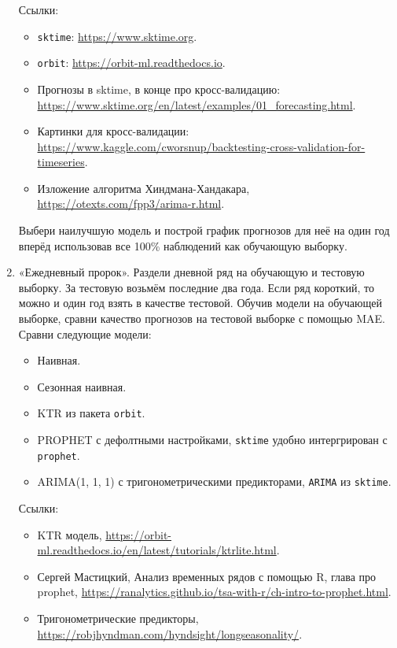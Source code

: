 \documentclass[12pt]{article}
\begin{document}
\begin{enumerate}
    Ссылки: 
    \begin{itemize}
        \item \verb|sktime|: \url{https://www.sktime.org}.
        \item \verb|orbit|: \url{https://orbit-ml.readthedocs.io}.
        \item Прогнозы в sktime, в конце про кросс-валидацию: \url{https://www.sktime.org/en/latest/examples/01_forecasting.html}.
        \item Картинки для кросс-валидации: \url{https://www.kaggle.com/cworsnup/backtesting-cross-validation-for-timeseries}.
        \item Изложение алгоритма Хиндмана-Хандакара, \url{https://otexts.com/fpp3/arima-r.html}.
    \end{itemize}

    Выбери наилучшую модель и построй график прогнозов для неё на один год вперёд использовав все 100\% наблюдений как обучающую выборку.

    \newpage
    \item «Ежедневный пророк». 
    Раздели дневной ряд на обучающую и тестовую выборку. За тестовую возьмём последние два года. Если ряд короткий, то можно и один год взять в качестве тестовой.
    Обучив модели на обучающей выборке, сравни качество прогнозов
    на тестовой выборке с помощью MAE. Сравни следующие модели:

    \begin{itemize}
        \item Наивная.
        \item Сезонная наивная.
        \item KTR из пакета \verb|orbit|.
        \item PROPHET с дефолтными настройками, \verb|sktime| удобно интергрирован с \verb|prophet|.
        \item ARIMA(1, 1, 1) с тригонометрическими предикторами, \verb|ARIMA| из \verb|sktime|.
    \end{itemize}

    Ссылки: 
    \begin{itemize}
        \item KTR модель, \url{https://orbit-ml.readthedocs.io/en/latest/tutorials/ktrlite.html}.
        \item Сергей Мастицкий, Анализ временных рядов с помощью R, глава про prophet, \url{https://ranalytics.github.io/tsa-with-r/ch-intro-to-prophet.html}.
        \item Тригонометрические предикторы, \url{https://robjhyndman.com/hyndsight/longseasonality/}.
    \end{itemize}



\end{enumerate}
\end{document}
